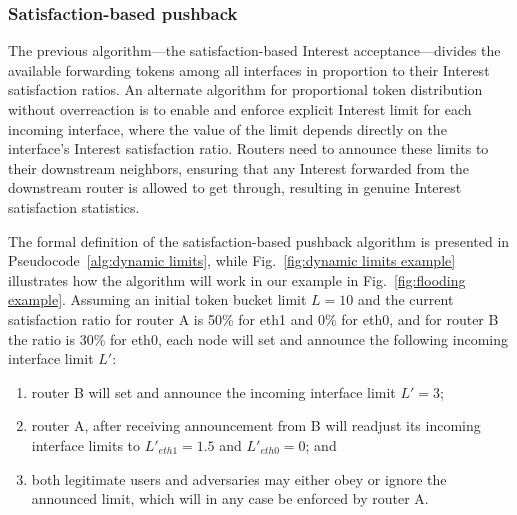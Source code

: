 \documentclass[10pt,conference]{IEEEtran}
\renewcommand{\texttt}[1]{{\nicettfont #1}}
\begin{document}

\subsubsection{\textbf{Satisfaction-based pushback}}
\label{sec:dynamic limits}


The previous algorithm---the satisfaction-based Interest acceptance---divides the available forwarding tokens among all interfaces in proportion to their Interest satisfaction ratios.
An alternate algorithm for proportional token distribution without overreaction is to enable and enforce explicit Interest limit for each incoming interface, where the value of the limit depends directly on the interface's Interest satisfaction ratio.
Routers need to announce these limits to their downstream neighbors, ensuring that any Interest forwarded from the downstream router is allowed to get through, resulting in genuine Interest satisfaction statistics.

The formal definition of the satisfaction-based pushback algorithm is presented in Pseudocode~\ref{alg:dynamic limits}, while Fig.~\ref{fig:dynamic limits example} illustrates how the algorithm will work in our example in Fig.~\ref{fig:flooding example}.
Assuming an initial token bucket limit $L=10$ and the current satisfaction ratio for router A is 50\% for \texttt{eth1} and 0\% for \texttt{eth0}, and for router B the ratio is 30\% for \texttt{eth0}, each node will set and announce the following  incoming interface limit $L'$: 
\begin{enumerate}
\item router B will set and announce the incoming interface limit $L'=3$;
\item router A, after receiving announcement from B will readjust its incoming interface limits to $L'_{eth1} = 1.5$ and $L'_{eth0} = 0$; and
\item both legitimate users and adversaries may either obey or ignore the announced limit, which will in any case be enforced by router A.
\end{enumerate}
\end{document}
